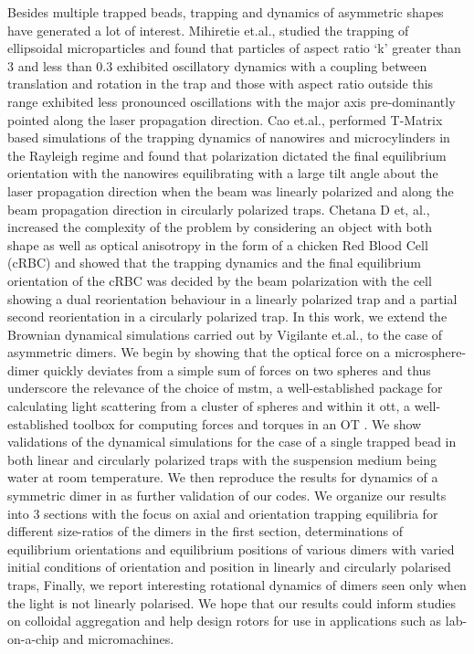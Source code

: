 \documentclass[preprint,  3p]{elsarticle}
\begin{document}
Besides multiple trapped beads, trapping and dynamics of asymmetric shapes have generated a lot of interest. Mihiretie et.al., \cite{Loudet_2014} studied the trapping of ellipsoidal microparticles and found that particles of aspect ratio ‘k’ greater than 3 and less than 0.3 exhibited oscillatory dynamics with a coupling between translation and rotation in the trap and those with aspect ratio outside this range exhibited less pronounced oscillations with the major axis pre-dominantly pointed along the laser propagation direction. Cao et.al., \cite{Curran_1999} performed T-Matrix based simulations of the trapping dynamics of nanowires and microcylinders in the Rayleigh regime and found that polarization dictated the final equilibrium orientation with the nanowires equilibrating with a large tilt angle about the laser propagation direction when the beam was linearly polarized and along the beam propagation direction in circularly polarized traps. Chetana D et, al., \cite{Chetana_2022} increased the complexity of the problem by considering an object with both shape as well as optical anisotropy in the form of a chicken Red Blood Cell (cRBC) and showed that the trapping dynamics and the final equilibrium orientation of the cRBC was decided by the beam polarization with the cell showing a dual reorientation behaviour in a linearly polarized trap and a partial second reorientation in a circularly polarized trap.  
In this work, we extend the Brownian dynamical simulations carried out by Vigilante et.al., \cite{Vigilante_2020} to the case of asymmetric dimers. We begin by showing that the optical force on a microsphere-dimer quickly deviates from a simple sum of forces on two spheres and thus underscore the relevance of the choice of mstm, a well-established package for calculating light scattering from a cluster of spheres \cite{Mackowski_2011} and within it ott, a well-established toolbox for computing forces and torques in an OT \cite{Nieminen_2007}.  We show validations of the dynamical simulations for the case of a single trapped bead in both linear and circularly polarized traps with the suspension medium being water at room temperature. We then reproduce the results for dynamics of a symmetric dimer in \cite{Vigilante_2020} as further validation of our codes. We organize our results into 3 sections with the focus on axial and orientation trapping equilibria for different size-ratios of the dimers in the first section, determinations of equilibrium orientations and equilibrium positions of various dimers with varied initial conditions of orientation and position in linearly and circularly polarised traps, Finally, we report interesting rotational dynamics of dimers seen only when the light is not linearly polarised. We hope that our results could inform studies on colloidal aggregation and help design rotors for use in applications such as lab-on-a-chip and micromachines.        
\end{document}
